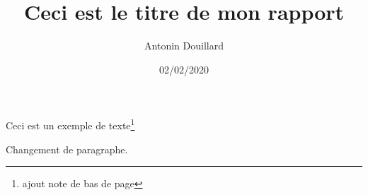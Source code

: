 \documentclass[a4paper,french,11pt]{report}
\title{Ceci est le titre de mon rapport}
\author{Antonin Douillard}
\date{02/02/2020}
\begin{document}
\maketitle

Ceci est un exemple de texte\thanks{ajout note de bas de page}

Changement de paragraphe.
\end{document}
